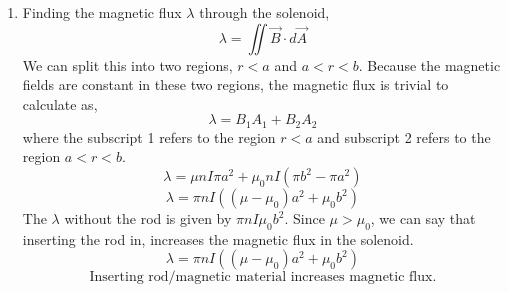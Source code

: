 \documentclass[12pt]{article}
\begin{document}
\begin{enumerate}
\begin{enumerate}
		\item [b.]
		Finding the magnetic flux $\lambda$ through the solenoid,
		\[\lambda=\iint \vec B \cdot d\vec A\]
		We can split this into two regions, $r<a$ and $a<r<b$.
		Because the magnetic fields are constant in these two regions, the magnetic flux is trivial to calculate as,
		\[\lambda = B_1A_1 + B_2A_2\]
		where the subscript 1 refers to the region $r<a$ and subscript 2 refers to the region $a<r<b$.
		\[\lambda = \mu n I \pi a^2 + \mu_0 n I (\pi b^2-\pi a^2)\]
		\[\lambda = \pi nI((\mu-\mu_0) a^2 + \mu_0 b^2)\]
		The $\lambda$ without the rod is given by $\pi n I \mu_0 b^2$.
		Since $\mu>\mu_0$, we can say that inserting the rod in, increases the magnetic flux in the solenoid.
		\[\boxed{\lambda = \pi nI((\mu-\mu_0) a^2 + \mu_0 b^2)}\]
		\[\boxed{\text{Inserting rod/magnetic material increases magnetic flux.}}\]

	\end{enumerate}


\end{enumerate}
\end{document}

